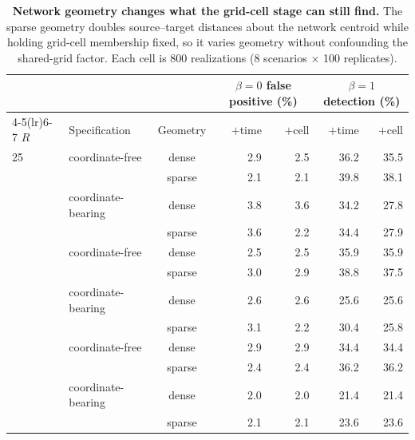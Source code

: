 \documentclass[11pt]{article}
\begin{document}
\begin{table}[htbp]\centering\footnotesize
\caption{\textbf{Network geometry changes what the grid-cell stage can still find.} The sparse geometry doubles source--target distances about the network centroid while holding grid-cell membership fixed, so it varies geometry without confounding the shared-grid factor. Each cell is 800 realizations (8 scenarios $\times$ 100 replicates).}
\label{si:t38}
\begin{tabular}{llcrrrr}\toprule
& & & \multicolumn{2}{c}{$\beta=0$ false positive (\%)} & \multicolumn{2}{c}{$\beta=1$ detection (\%)}\\
\cmidrule(lr){4-5}\cmidrule(lr){6-7}
$R$ & Specification & Geometry & $+$time & $+$cell & $+$time & $+$cell \\ \midrule
25 & coordinate-free & dense & 2.9 & 2.5 & 36.2 & 35.5 \\
 &  & sparse & 2.1 & 2.1 & 39.8 & 38.1 \\
 & coordinate-bearing & dense & 3.8 & 3.6 & 34.2 & 27.8 \\
 &  & sparse & 3.6 & 2.2 & 34.4 & 27.9 \\
\addlinespace
50 & coordinate-free & dense & 2.5 & 2.5 & 35.9 & 35.9 \\
 &  & sparse & 3.0 & 2.9 & 38.8 & 37.5 \\
 & coordinate-bearing & dense & 2.6 & 2.6 & 25.6 & 25.6 \\
 &  & sparse & 3.1 & 2.2 & 30.4 & 25.8 \\
\addlinespace
100 & coordinate-free & dense & 2.9 & 2.9 & 34.4 & 34.4 \\
 &  & sparse & 2.4 & 2.4 & 36.2 & 36.2 \\
 & coordinate-bearing & dense & 2.0 & 2.0 & 21.4 & 21.4 \\
 &  & sparse & 2.1 & 2.1 & 23.6 & 23.6 \\
\bottomrule\end{tabular}\end{table}
\end{document}
